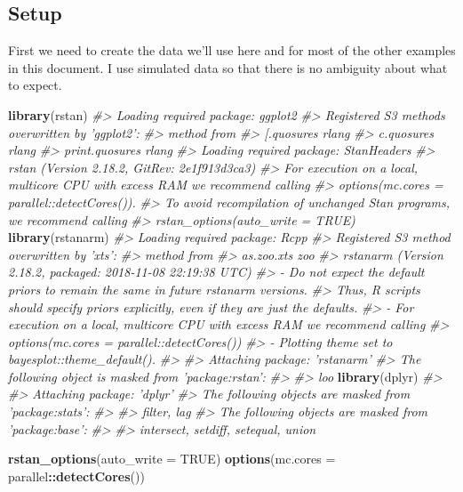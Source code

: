 \documentclass[]{book}
\newenvironment{Shaded}{\begin{snugshade}}{\end{snugshade}}
\newcommand{\CommentTok}[1]{\textcolor[rgb]{0.56,0.35,0.01}{\textit{#1}}}
\newcommand{\DataTypeTok}[1]{\textcolor[rgb]{0.13,0.29,0.53}{#1}}
\newcommand{\KeywordTok}[1]{\textcolor[rgb]{0.13,0.29,0.53}{\textbf{#1}}}
\newcommand{\NormalTok}[1]{#1}
\newcommand{\OperatorTok}[1]{\textcolor[rgb]{0.81,0.36,0.00}{\textbf{#1}}}
\newcommand{\OtherTok}[1]{\textcolor[rgb]{0.56,0.35,0.01}{#1}}
\begin{document}
\hypertarget{setup}{%
\subsection{Setup}\label{setup}}

First we need to create the data we'll use here and for most of the other examples in this document. I use simulated data so that there is no ambiguity about what to expect.

\begin{Shaded}
\begin{Highlighting}[]
\KeywordTok{library}\NormalTok{(rstan)}
\CommentTok{#> Loading required package: ggplot2}
\CommentTok{#> Registered S3 methods overwritten by 'ggplot2':}
\CommentTok{#>   method         from }
\CommentTok{#>   [.quosures     rlang}
\CommentTok{#>   c.quosures     rlang}
\CommentTok{#>   print.quosures rlang}
\CommentTok{#> Loading required package: StanHeaders}
\CommentTok{#> rstan (Version 2.18.2, GitRev: 2e1f913d3ca3)}
\CommentTok{#> For execution on a local, multicore CPU with excess RAM we recommend calling}
\CommentTok{#> options(mc.cores = parallel::detectCores()).}
\CommentTok{#> To avoid recompilation of unchanged Stan programs, we recommend calling}
\CommentTok{#> rstan_options(auto_write = TRUE)}
\KeywordTok{library}\NormalTok{(rstanarm)}
\CommentTok{#> Loading required package: Rcpp}
\CommentTok{#> Registered S3 method overwritten by 'xts':}
\CommentTok{#>   method     from}
\CommentTok{#>   as.zoo.xts zoo}
\CommentTok{#> rstanarm (Version 2.18.2, packaged: 2018-11-08 22:19:38 UTC)}
\CommentTok{#> - Do not expect the default priors to remain the same in future rstanarm versions.}
\CommentTok{#> Thus, R scripts should specify priors explicitly, even if they are just the defaults.}
\CommentTok{#> - For execution on a local, multicore CPU with excess RAM we recommend calling}
\CommentTok{#> options(mc.cores = parallel::detectCores())}
\CommentTok{#> - Plotting theme set to bayesplot::theme_default().}
\CommentTok{#> }
\CommentTok{#> Attaching package: 'rstanarm'}
\CommentTok{#> The following object is masked from 'package:rstan':}
\CommentTok{#> }
\CommentTok{#>     loo}
\KeywordTok{library}\NormalTok{(dplyr)}
\CommentTok{#> }
\CommentTok{#> Attaching package: 'dplyr'}
\CommentTok{#> The following objects are masked from 'package:stats':}
\CommentTok{#> }
\CommentTok{#>     filter, lag}
\CommentTok{#> The following objects are masked from 'package:base':}
\CommentTok{#> }
\CommentTok{#>     intersect, setdiff, setequal, union}

\KeywordTok{rstan_options}\NormalTok{(}\DataTypeTok{auto_write =} \OtherTok{TRUE}\NormalTok{)}
\KeywordTok{options}\NormalTok{(}\DataTypeTok{mc.cores =}\NormalTok{ parallel}\OperatorTok{::}\KeywordTok{detectCores}\NormalTok{())}
\end{Highlighting}
\end{Shaded}
\end{document}
